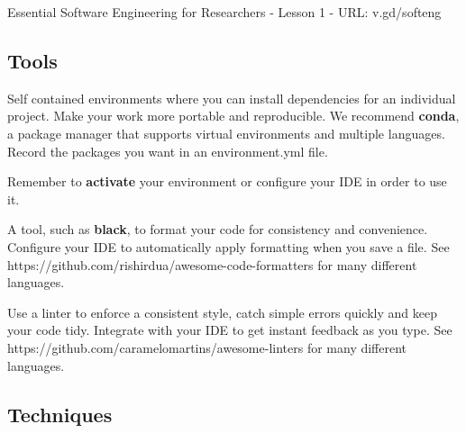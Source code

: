 \documentclass[8pt]{extarticle}
\begin{document}
\thispagestyle{empty}

\begin{center}
  {\LARGE
  Essential Software Engineering for Researchers - Lesson 1 - URL: v.gd/softeng}
\end{center}

\subsection*{Tools}

\begin{navybox}[title=Virtual Environments]
  Self contained environments where you can install dependencies for an
  individual project. Make your work more portable and reproducible. We
  recommend \textbf{conda}, a package manager that supports virtual environments
  and multiple languages. Record the packages you want in an environment.yml
  file.\par
  \vspace{5pt minus 3pt}

  \quad
  \vspace{5pt minus 3pt}

  Remember to \textbf{activate} your environment or configure your IDE in order
  to use it.
\end{navybox}

\begin{bluebox}[title=Code Formatters]
  A tool, such as \textbf{black}, to format your code for consistency and
  convenience. Configure your IDE to automatically apply formatting when you
  save a file.  See https://github.com/rishirdua/awesome-code-formatters for
  many different languages.
\end{bluebox}

\begin{navybox}[title=Linters]
  Use a linter to enforce a consistent style, catch simple errors quickly and
  keep your code tidy. Integrate with your IDE to get instant feedback as you
  type. See https://github.com/caramelomartins/awesome-linters for many
  different languages.
\end{navybox}

\subsection*{Techniques}
\end{document}
